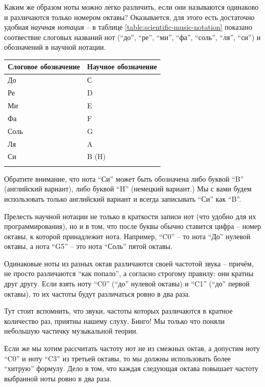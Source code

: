 \documentclass[a4paper,twoside]{book}
\begin{document}
Каким же образом ноты можно легко различить, если они называются одинаково и
различаются только номером октавы? Оказывается, для этого есть достаточно
удобная \emph{научная нотация} -- в таблице \ref{table:scientific-music-notation}
показано соотвествие слоговых названий нот (``до'', ``ре'', ``ми'', ``фа'',
``соль'', ``ля'', ``си'') и обозначений в научной нотации.

\begin{tabular}{p{4cm}|p{4cm}}
  Слоговое обозначение & Научное обозначение \\
  \hline \hline
  До   & С \\
  \hline
  Ре   & D \\
  \hline
  Ми   & E \\
  \hline
  Фа   & F \\
  \hline
  Соль & G \\
  \hline
  Ля   & A \\
  \hline
  Си   & B (H) \\
  \hline
  \label{table:scientific-music-notation}
\end{tabular}

Обратите внимание, что нота ``Си'' может быть обозначена либо буквой ``B''
(английский вариант), либо буквой ``H'' (немецкий вариант.) Мы с вами будем
использовать только английский вариант и всегда записывать ``Си'' как ``B''.

Прелесть научной нотации не только в краткости записи нот (что удобно для их
программирования), но и в том, что после буквы обычно ставится цифра -- номер
октавы, к которой принадлежит нота. Например, ``C0'' -- то нота ``До'' нулевой
октавы, а нота ``G5'' -- это нота ``Соль'' пятой октавы.

Одинаковые ноты из разных октав различаются своей частотой звука -- причём, не
просто различаются ``как попало'', а согласно строгому правилу: они кратны друг
другу. Если взять ноту ``C0'' (``до'' нулевой октавы) и ``C1'' (``до'' первой
октавы), то их частоты будут различаться ровно в два раза.

Тут стоит вспомнить, что звуки, частоты которых различаются в кратное количество
раз, приятны нашему слуху. Бинго! Мы только что поняли небольшую частичку
музыкальной теории.

Если же мы хотим рассчитать частоту нот не из смежных октав, а допустим ноту
``C0'' и ноту ``C3'' из третьей октавы, то мы должны использовать более
``хитрую'' формулу. Дело в том, что каждая следующая октава повышает частоту
выбранной ноты ровно в два раза.
\end{document}
